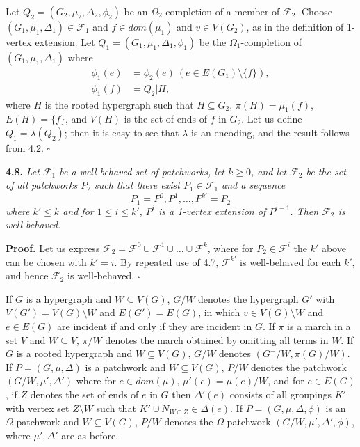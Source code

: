 Let $Q_2 = (G_2, \mu_2, \Delta_2, \phi_2)$ be an $\Omega_2$-completion of a member of $\mathcal{F}_2$. Choose $(G_1, \mu_1, \Delta_1) \in \mathcal{F}_1$ and $f \in dom(\mu_1)$ and $v \in V(G_2)$, as in the definition of 1-vertex extension. Let $Q_1 = (G_1, \mu_1, \Delta_1, \phi_1)$ be the $\Omega_1$-completion of $(G_1, \mu_1, \Delta_1)$ where
\begin{align*}
\phi_1(e) &= \phi_2(e)\ (e \in E(G_1) \setminus \{f\}), \\
\phi_1(f) &= Q_2|H,
\end{align*}
where $H$ is the rooted hypergraph such that $H \subseteq G_2$, $\pi(H) = \mu_1(f)$, $E(H) = \{f\}$, and $V(H)$ is the set of ends of $f$ in $G_2$. Let us define $Q_1 = \lambda(Q_2)$; then it is easy to see that $\lambda$ is an encoding, and the result follows from 4.2. $\square$

\textbf{4.8.} \textit{Let $\mathcal{F}_1$ be a well-behaved set of patchworks, let $k \ge 0$, and let $\mathcal{F}_2$ be the set of all patchworks $P_2$ such that there exist $P_1 \in \mathcal{F}_1$ and a sequence}
\begin{equation*}
P_1 = P^0, P^1, \dots, P^{k'} = P_2
\end{equation*}
\textit{where $k' \le k$ and for $1 \le i \le k'$, $P^i$ is a 1-vertex extension of $P^{i-1}$. Then $\mathcal{F}_2$ is well-behaved.}

\textbf{Proof.} Let us express $\mathcal{F}_2 = \mathcal{F}^0 \cup \mathcal{F}^1 \cup \dots \cup \mathcal{F}^k$, where for $P_2 \in \mathcal{F}^i$ the $k'$ above can be chosen with $k' = i$. By repeated use of 4.7, $\mathcal{F}^{k'}$ is well-behaved for each $k'$, and hence $\mathcal{F}_2$ is well-behaved. $\square$

If $G$ is a hypergraph and $W \subseteq V(G)$, $G/W$ denotes the hypergraph $G'$ with $V(G') = V(G) \setminus W$ and $E(G') = E(G)$, in which $v \in V(G) \setminus W$ and $e \in E(G)$ are incident if and only if they are incident in $G$. If $\pi$ is a march in a set $V$ and $W \subseteq V$, $\pi/W$ denotes the march obtained by omitting all terms in $W$. If $G$ is a rooted hypergraph and $W \subseteq V(G)$, $G/W$ denotes $(G^- / W, \pi(G)/W)$. If $P = (G, \mu, \Delta)$ is a patchwork and $W \subseteq V(G)$, $P/W$ denotes the patchwork $(G/W, \mu', \Delta')$ where for $e \in dom(\mu)$, $\mu'(e) = \mu(e)/W$, and for $e \in E(G)$, if $Z$ denotes the set of ends of $e$ in $G$ then $\Delta'(e)$ consists of all groupings $K'$ with vertex set $Z \setminus W$ such that $K' \cup N_{W \cap Z} \in \Delta(e)$. If $P = (G, \mu, \Delta, \phi)$ is an $\Omega$-patchwork and $W \subseteq V(G)$, $P/W$ denotes the $\Omega$-patchwork $(G/W, \mu', \Delta', \phi)$, where $\mu', \Delta'$ are as before.

